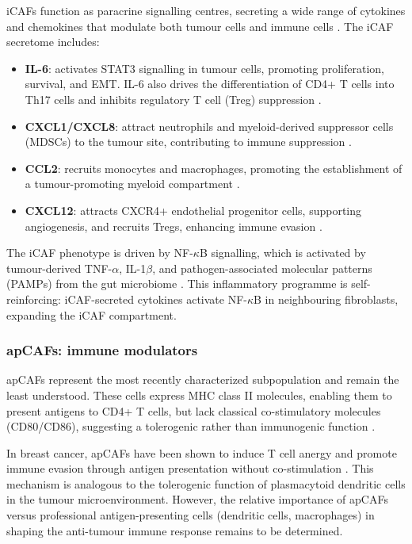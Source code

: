 iCAFs function as paracrine signalling centres, secreting a wide range of cytokines and chemokines that modulate both tumour cells and immune cells \citep{erve2024}. The iCAF secretome includes:

\begin{itemize}
  \item \textbf{IL-6}: activates STAT3 signalling in tumour cells, promoting proliferation, survival, and EMT. IL-6 also drives the differentiation of CD4+ T cells into Th17 cells and inhibits regulatory T cell (Treg) suppression \citep{chang2014}.
  \item \textbf{CXCL1/CXCL8}: attract neutrophils and myeloid-derived suppressor cells (MDSCs) to the tumour site, contributing to immune suppression \citep{acharyya2012}.
  \item \textbf{CCL2}: recruits monocytes and macrophages, promoting the establishment of a tumour-promoting myeloid compartment \citep{qian2011}.
  \item \textbf{CXCL12}: attracts CXCR4+ endothelial progenitor cells, supporting angiogenesis, and recruits Tregs, enhancing immune evasion \citep{orimo2005stromal}.
\end{itemize}

The iCAF phenotype is driven by NF-$\kappa$B signalling, which is activated by tumour-derived TNF-$\alpha$, IL-1$\beta$, and pathogen-associated molecular patterns (PAMPs) from the gut microbiome \citep{erve2024}. This inflammatory programme is self-reinforcing: iCAF-secreted cytokines activate NF-$\kappa$B in neighbouring fibroblasts, expanding the iCAF compartment.

\subsubsection{apCAFs: immune modulators}

apCAFs represent the most recently characterized subpopulation and remain the least understood. These cells express MHC class II molecules, enabling them to present antigens to CD4+ T cells, but lack classical co-stimulatory molecules (CD80/CD86), suggesting a tolerogenic rather than immunogenic function \citep{erve2024}.

In breast cancer, apCAFs have been shown to induce T cell anergy and promote immune evasion through antigen presentation without co-stimulation \citep{pinchuk2008}. This mechanism is analogous to the tolerogenic function of plasmacytoid dendritic cells in the tumour microenvironment. However, the relative importance of apCAFs versus professional antigen-presenting cells (dendritic cells, macrophages) in shaping the anti-tumour immune response remains to be determined.

